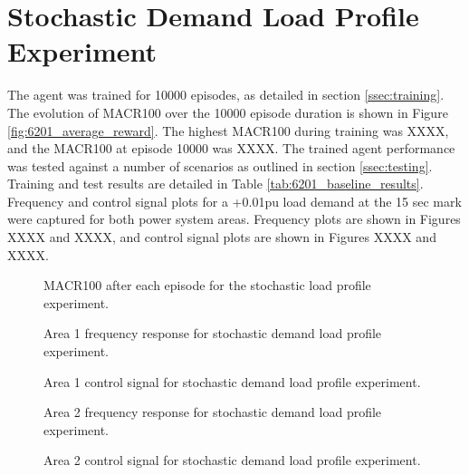 \section{Stochastic Demand Load Profile Experiment}
The agent was trained for 10000 episodes, as detailed in section \ref{ssec:training}. The evolution of MACR100 over the 10000 episode duration is shown in Figure \ref{fig:6201_average_reward}. The highest MACR100 during training was XXXX, and the MACR100 at episode 10000 was XXXX. The trained agent performance was tested against a number of scenarios as outlined in section \ref{ssec:testing}. Training and test results are detailed in Table \ref{tab:6201_baseline_results}. Frequency and control signal plots for a +0.01pu load demand at the 15 sec mark were captured for both power system areas. Frequency plots are shown in Figures XXXX and XXXX, and control signal plots are shown in Figures XXXX and XXXX.

\vspace{2cm}

\begin{figure}[h]
	\centering
	
	\caption{MACR100 after each episode for the stochastic load profile experiment.}
\end{figure}



\begin{figure}[h]
	\centering
	
	
	\vspace{-0.5cm}
	\caption{Area 1 frequency response for stochastic demand load profile experiment.}
	
	\vspace{0.5cm}
	
	
	\vspace{-0.5cm}
	\caption{Area 1 control signal for stochastic demand load profile experiment.}
	
	\vspace{0.5cm}
	
	
	\vspace{-0.5cm}
	\caption{Area 2 frequency response for stochastic demand load profile experiment.}
	
	\vspace{0.5cm}
			
	
	\vspace{-0.5cm}
	\caption{Area 2 control signal for stochastic demand load profile experiment.}
\end{figure}